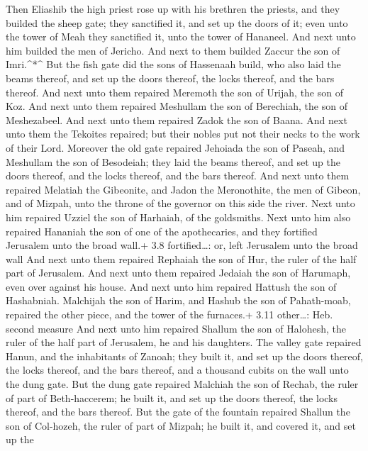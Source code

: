  Then Eliashib the high priest rose up with his brethren the
priests, and they builded the sheep gate; they sanctified it, and set up
the doors of it; even unto the tower of Meah they sanctified it, unto
the tower of Hananeel.  And next unto him builded the men of
Jericho. And next to them builded Zaccur the son of Imri.\^{}*\^{}
 But the fish gate did the sons of Hassenaah build, who also
laid the beams thereof, and set up the doors thereof, the locks thereof,
and the bars thereof.  And next unto them repaired Meremoth
the son of Urijah, the son of Koz. And next unto them repaired Meshullam
the son of Berechiah, the son of Meshezabeel. And next unto them
repaired Zadok the son of Baana.  And next unto them the
Tekoites repaired; but their nobles put not their necks to the work of
their Lord.  Moreover the old gate repaired Jehoiada the son
of Paseah, and Meshullam the son of Besodeiah; they laid the beams
thereof, and set up the doors thereof, and the locks thereof, and the
bars thereof.  And next unto them repaired Melatiah the
Gibeonite, and Jadon the Meronothite, the men of Gibeon, and of Mizpah,
unto the throne of the governor on this side the river. 
Next unto him repaired Uzziel the son of Harhaiah, of the goldsmiths.
Next unto him also repaired Hananiah the son of one of the apothecaries,
and they fortified Jerusalem unto the broad wall.+ 3.8 fortified\ldots:
or, left Jerusalem unto the broad wall  And next unto them
repaired Rephaiah the son of Hur, the ruler of the half part of
Jerusalem.  And next unto them repaired Jedaiah the son of
Harumaph, even over against his house. And next unto him repaired
Hattush the son of Hashabniah.  Malchijah the son of Harim,
and Hashub the son of Pahath-moab, repaired the other piece, and the
tower of the furnaces.+ 3.11 other\ldots: Heb. second measure
 And next unto him repaired Shallum the son of Halohesh,
the ruler of the half part of Jerusalem, he and his daughters.
 The valley gate repaired Hanun, and the inhabitants of
Zanoah; they built it, and set up the doors thereof, the locks thereof,
and the bars thereof, and a thousand cubits on the wall unto the dung
gate.  But the dung gate repaired Malchiah the son of
Rechab, the ruler of part of Beth-haccerem; he built it, and set up the
doors thereof, the locks thereof, and the bars thereof. 
But the gate of the fountain repaired Shallun the son of Col-hozeh, the
ruler of part of Mizpah; he built it, and covered it, and set up the
